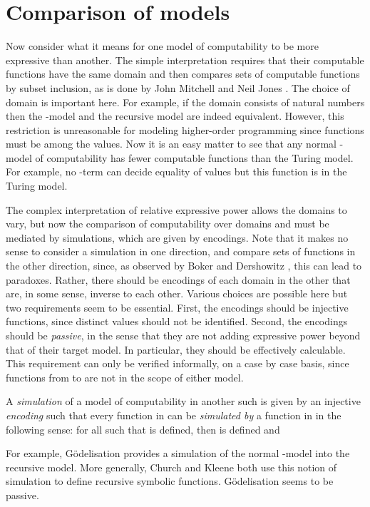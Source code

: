 \documentclass[a4paper]{article}
\begin{document}
\section{Comparison of models} 
\label{sec:equiv_models}

Now consider what it means for one model of computability to be more
expressive than another.  The simple interpretation requires that
their computable functions have the same domain and then compares sets
of computable functions by subset inclusion, as is done by John
Mitchell \cite{Mitchell92} and Neil Jones \cite{Jones97}.  The choice
of domain is important here. For example, if the domain consists of
natural numbers then the -model and the recursive model are indeed
equivalent.  However, this restriction is unreasonable for modeling
higher-order programming since functions must be among the values. Now
it is an easy matter to see that any normal -model of
computability has fewer computable functions than the Turing model.
For example, no -term can decide equality of values but this
function is in the Turing model.

The complex interpretation of relative expressive power allows the
domains to vary, but now the comparison of computability over domains
 and  must be mediated by simulations, which are given by
encodings.  Note that it makes no sense to consider a simulation in
one direction, and compare sets of functions in the other direction,
since, as observed by Boker and Dershowitz \cite{BokerD06}, this can
lead to paradoxes.  Rather, there should be encodings of each domain
in the other that are, in some sense, inverse to each other. Various
choices are possible here but two requirements seem to be essential.
First, the encodings should be injective functions, since distinct
values should not be identified.  Second, the encodings should be {\em
  passive}, in the sense that they are not adding expressive power
beyond that of their target model. In particular, they should be
effectively calculable.  This requirement can only be verified
informally, on a case by case basis, since functions from  to
 are not in the scope of either model.

A {\em simulation} of a model of computability  in another such
 is given by an injective {\em encoding}  such that every function  in  can be {\em
  simulated by} a function  in  in the following sense:
for all  such that  is
defined, then  is defined and


For example, G\"odelisation provides a simulation of the normal
-model into the recursive model. More generally, Church and Kleene
both use this notion of simulation to define  recursive
symbolic functions. 
G\"odelisa\-tion seems to be passive.
\end{document}
